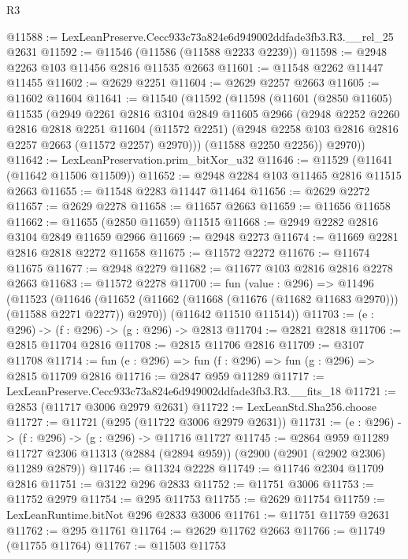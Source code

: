 \begin{lexlean}{R3}
\begin{coremodule}
@11588 := LexLeanPreserve.Cecc933c73a824e6d949002ddfade3fb3.R3.__rel_25 @2631
@11592 := @11546 (@11586 (@11588 @2233 @2239))
@11598 := @2948 @2263 @103 @11456 @2816 @11535 @2663
@11601 := @11548 @2262 @11447 @11455
@11602 := @2629 @2251
@11604 := @2629 @2257 @2663
@11605 := @11602 @11604
@11641 := @11540
    (@11592
      (@11598
        (@11601
          (@2850 @11605)
          @11535
          (@2949
            @2261
            @2816
            @3104
            @2849
            @11605
            @2966
            (@2948
              @2252
              @2260
              @2816
              @2818
              @2251
              @11604
              (@11572 @2251)
              (@2948 @2258 @103 @2816 @2816 @2257 @2663 (@11572 @2257) @2970)))
          (@11588 @2250 @2256))
        @2970))
@11642 := LexLeanPreservation.prim_bitXor_u32
@11646 := @11529 (@11641 (@11642 @11506 @11509))
@11652 := @2948 @2284 @103 @11465 @2816 @11515 @2663
@11655 := @11548 @2283 @11447 @11464
@11656 := @2629 @2272
@11657 := @2629 @2278
@11658 := @11657 @2663
@11659 := @11656 @11658
@11662 := @11655 (@2850 @11659) @11515
@11668 := @2949 @2282 @2816 @3104 @2849 @11659 @2966
@11669 := @2948 @2273
@11674 := @11669 @2281 @2816 @2818 @2272 @11658
@11675 := @11572 @2272
@11676 := @11674 @11675
@11677 := @2948 @2279
@11682 := @11677 @103 @2816 @2816 @2278 @2663
@11683 := @11572 @2278
@11700 := fun (value : @296) =>
  @11496
    (@11523
      (@11646 (@11652 (@11662 (@11668 (@11676 (@11682 @11683 @2970))) (@11588 @2271 @2277)) @2970))
      (@11642 @11510 @11514))
@11703 := (e : @296) -> (f : @296) -> (g : @296) -> @2813
@11704 := @2821 @2818
@11706 := @2815 @11704 @2816
@11708 := @2815 @11706 @2816
@11709 := @3107 @11708
@11714 := fun (e : @296) => fun (f : @296) => fun (g : @296) => @2815 @11709 @2816
@11716 := @2847 @959 @11289
@11717 := LexLeanPreserve.Cecc933c73a824e6d949002ddfade3fb3.R3.__fits_18
@11721 := @2853 (@11717 @3006 @2979 @2631)
@11722 := LexLeanStd.Sha256.choose
@11727 := @11721 (@295 (@11722 @3006 @2979 @2631))
@11731 := (e : @296) -> (f : @296) -> (g : @296) -> @11716 @11727
@11745 := @2864
    @959
    @11289
    @11727
    @2306
    @11313
    (@2884 (@2894 @959))
    (@2900 (@2901 (@2902 @2306) @11289 @2879))
@11746 := @11324 @2228
@11749 := @11746 @2304 @11709 @2816
@11751 := @3122 @296 @2833
@11752 := @11751 @3006
@11753 := @11752 @2979
@11754 := @295 @11753
@11755 := @2629 @11754
@11759 := LexLeanRuntime.bitNot @296 @2833 @3006
@11761 := @11751 @11759 @2631
@11762 := @295 @11761
@11764 := @2629 @11762 @2663
@11766 := @11749 (@11755 @11764)
@11767 := @11503 @11753

\end{coremodule}
\end{lexlean}
